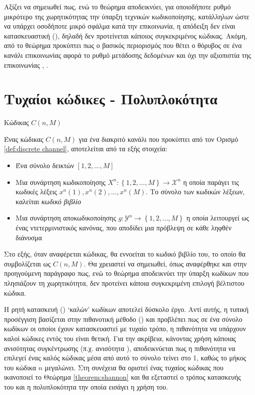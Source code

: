Αξίζει να σημειωθεί πως, ενώ το θεώρημα  αποδεικνύει, για οποιοδήποτε ρυθμό μικρότερο της χωρητικότητας την ύπαρξη τεχνικών κωδικοποίησης, κατάλληλων ώστε να υπάρχει οσοδήποτε μικρό σφάλμα κατά την επικοινωνία, η απόδειξη δεν είναι κατασκευαστική (), δηλαδή δεν προτείνεται κάποιος συγκεκριμένος κώδικας. Ακόμη, από το θεώρημα προκύπτει πως ο βασικός περιορισμός που θέτει ο θόρυβος σε ένα κανάλι επικοινωνίας αφορά το ρυθμό μετάδοσης δεδομένων και όχι την αξιοπιστία της επικοινωνίας \cite{proakis1994communication}, \cite{shannon1948mathematical}.

\section{Τυχαίοι κώδικες - Πολυπλοκότητα}
\begin{definition}{Κώδικας $C(n,M)$}

Ένας κώδικας $C(n,M)$ για ένα διακριτό κανάλι που προκύπτει από τον Ορισμό \ref{def:discrete channel}, αποτελείται από τα εξής στοιχεία:
\begin{itemize}
\item Ένα σύνολο δεικτών $[1, 2, \ldots, M]$ 
\item Μια συνάρτηση κωδικοποίησης $X^n:\left\lbrace1, 2, \ldots, M\right\rbrace\to\mathcal{X}^n$ η οποία παράγει τις κωδικές λέξεις $x^n\left(1\right), x^n\left(2\right), \ldots, x^n\left(M\right)$. Το σύνολο των κωδικών λέξεων, καλείται \textit{κωδικό βιβλίο}
\item Μια συνάρτηση αποκωδικοποίησης $g:\mathcal{Y}^n\to\left\lbrace1, 2, \ldots, M\right\rbrace$ η οποία λειτουργεί ως ένας ντετερμινιστικός κανόνας, που αποδίδει μια πρόβλεψη σε κάθε ληφθέν διάνυσμα
\end{itemize}
\label{def:code}
\end{definition}

Στο εξής, όταν αναφέρεται κώδικας, θα εννοείται το κωδικό βιβλίο του, το οποίο θα συμβολίζεται ως $C(n,M)$. Θα χρειαστεί να σημειωθεί, όπως αναφέρθηκε και στην προηγούμενη παράγραφο πως, ενώ το θεώρημα  αποδεικνύει την ύπαρξη κωδίκων που πλησιάζουν τη χωρητικότητα, δεν προτείνει κάποια συγκεκριμένη επιλογή βέλτιστου κώδικα.

Η ρητή κατασκευή () \enquote*{καλών} κωδίκων αποτελεί δύσκολο έργο. Αντί αυτής, η τυπική προσέγγιση βασίζεται στην πιθανοτική μέθοδο () και προβλέπει πως σε ένα σύνολο κωδίκων οι οποίοι έχουν κατασκευαστεί με τυχαίο τρόπο, η πιθανότητα να υπάρχουν καλοί κώδικες εντός του είναι θετική. Για την ακρίβεια, κάνοντας χρήση κάποιας ανισότητας συγκέντρωσης (π.χ. ανισότητα ), αποδεικνύεται πως η πιθανότητα να επιλεγεί ένας καλός κώδικας μέσα από αυτό το σύνολο τείνει στο 1, καθώς το μήκος του κώδικα $n$ μεγαλώνει. Στη συνέχεια θα οριστεί ένας τυχαίος κώδικας που ικανοποιεί το Θεώρημα \ref{theorem:shannon} και θα εξεταστεί ο τρόπος κατασκευής του και η πολυπλοκότητα την οποία εισάγει η χρήση του.

